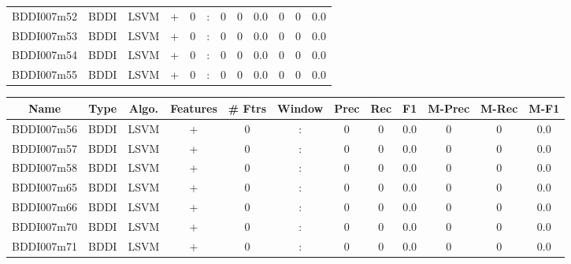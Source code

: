 \documentclass[a4paper]{article}
\begin{document}
\begin{landscape}
\begin{center}
\begin{tabular}{ |c|c|c|c|c|c|c|c|c|c|c|c|}
 
 	
 	\small{ BDDI007m52 } & BDDI & LSVM & +  &  0 &  :  &  0 & 0 & 0.0  &  0 & 0 & 0.0 \\
 	

 
 	
 	\small{ BDDI007m53 } & BDDI & LSVM & +  &  0 &  :  &  0 & 0 & 0.0  &  0 & 0 & 0.0 \\
 	

 
 	
 	\small{ BDDI007m54 } & BDDI & LSVM & +  &  0 &  :  &  0 & 0 & 0.0  &  0 & 0 & 0.0 \\
 	

 
 	
 	\small{ BDDI007m55 } & BDDI & LSVM & +  &  0 &  :  &  0 & 0 & 0.0  &  0 & 0 & 0.0 \\
 	
 \hline
\end{tabular}
\end{center}




\begin{center}
\begin{tabular}{ |c|c|c|c|c|c|c|c|c|c|c|c|} 
 \hline
 	Name & Type & Algo. & Features & \# Ftrs & Window & Prec & Rec & F1 & M-Prec & M-Rec & M-F1\\
 \hline

 	

 
 	
 	\small{ BDDI007m56 } & BDDI & LSVM & +  &  0 &  :  &  0 & 0 & 0.0  &  0 & 0 & 0.0 \\
 	

 
 	
 	\small{ BDDI007m57 } & BDDI & LSVM & +  &  0 &  :  &  0 & 0 & 0.0  &  0 & 0 & 0.0 \\
 	

 
 	
 	\small{ BDDI007m58 } & BDDI & LSVM & +  &  0 &  :  &  0 & 0 & 0.0  &  0 & 0 & 0.0 \\
 	

 
 	
 	\small{ BDDI007m65 } & BDDI & LSVM & +  &  0 &  :  &  0 & 0 & 0.0  &  0 & 0 & 0.0 \\
 	

 
 	
 	\small{ BDDI007m66 } & BDDI & LSVM & +  &  0 &  :  &  0 & 0 & 0.0  &  0 & 0 & 0.0 \\
 	

 
 	
 	\small{ BDDI007m70 } & BDDI & LSVM & +  &  0 &  :  &  0 & 0 & 0.0  &  0 & 0 & 0.0 \\
 	

 
 	
 	\small{ BDDI007m71 } & BDDI & LSVM & +  &  0 &  :  &  0 & 0 & 0.0  &  0 & 0 & 0.0 \\
 	

 
 \hline
\end{tabular}
\end{center}

\end{landscape}
\end{document}

